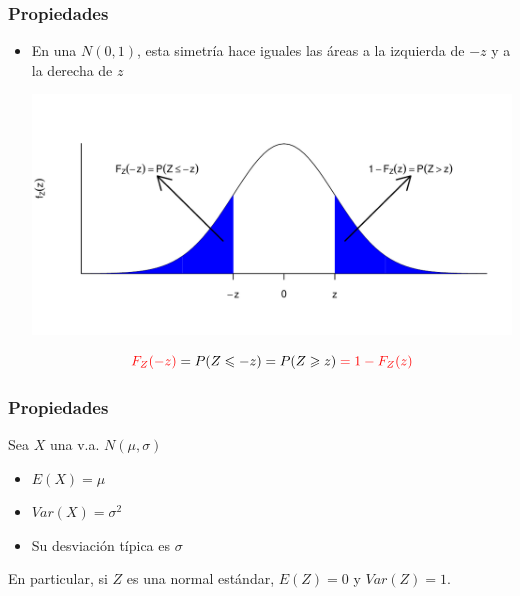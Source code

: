 \documentclass[handout]{beamer}\usepackage[]{graphicx}\usepackage[]{color}
\newcommand{\red}[1]{\textcolor{red}{#1}}
\renewcommand{\leq}{\leqslant}
\renewcommand{\geq}{\geqslant}
\theoremstyle{plain}
\theoremstyle{definition}
\begin{document}
\begin{frame}
\frametitle{Propiedades} 
\begin{itemize}
\item En una $N(0,1)$, esta simetría hace iguales  las áreas  a la izquierda de  $-z$ y a la derecha de $z$
\begin{center}
\includegraphics[width=\linewidth]{simnorm2}
\end{center}
\vspace*{-1cm}

$$
\red{F_{Z}(-z)}=P(Z\leq -z)=P(Z\geq  z)\red{{} =1-F_{Z}(z)}
$$
\end{itemize}
\end{frame}

\begin{frame}
\frametitle{Propiedades} 
Sea $X$ una v.a. $N(\mu,\sigma)$
\medskip

\begin{itemize}


\item$E(X)=\mu$ 
\medskip

\item$Var(X)=\sigma^2$ 
\medskip

\item  Su desviación típica es $\sigma$
\end{itemize}
\bigskip

En particular, si $Z$ es una normal estándar, $E(Z)=0$ y $Var(Z)=1$.
\end{frame}
\end{document}
